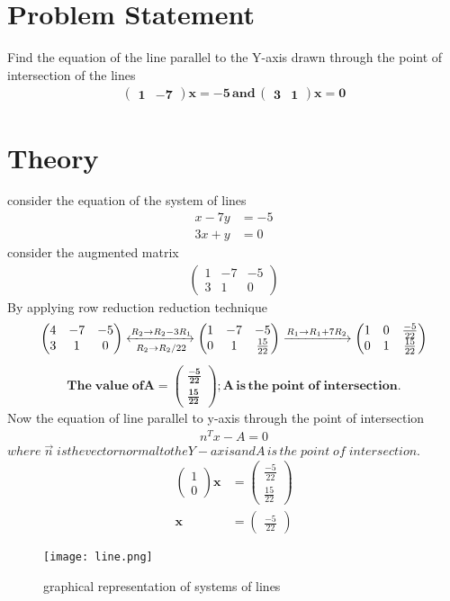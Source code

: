 \documentclass{article}
\newcommand{\myvec}[1]{\ensuremath{\begin{pmatrix}#1\end{pmatrix}}}
\begin{document}
\section{Problem Statement}
Find the equation of the line parallel to the Y-axis drawn through the point of intersection of the lines
\begin{align}
\mathbf{\myvec{1 & -7}x  =-5 \, and \, \myvec{3 & 1}x  = 0}
\end{align}
\section{Theory}
consider the equation of the system of lines
\begin{align}
x - 7y & = -5 \\
3x + y & = 0
\end{align}
 consider the augmented matrix
 \begin{align}
 \myvec{1 & -7 & -5 \\ 3 & 1 & 0}
 \end{align}
 By applying row reduction reduction technique \\
 \begin{align}
\myvec{4 & -7 & -5\\ 3 & 1 & 0}
	\xleftrightarrow[R_2 \rightarrow R_2/22]{R_2 \rightarrow R_2-3R_1}
	\myvec{1 & -7 & -5 \\ 0 & 1 & \frac{15}{22}}
	\xrightarrow[]{R_1 \rightarrow R_1+7R_2}
	 \myvec{1 & 0 & \frac{-5}{22} \\ 0 & 1 & \frac{15}{22}}
 \end{align}
\begin{align}
\mathbf{The\; value\; of{A} = \myvec{\frac{-5}{22} \\ \frac{15}{22}} ;
{A} \,is\, the\; point\; of \;intersection.}
\end{align}
 Now the equation of line parallel to y-axis through the point of intersection\\
\begin{align}
 {n}^T{x}-{A} = 0
\end{align}
$where \;\vec{n} \; is the vector normal to the Y - axis and{A}\, is\, the\; point\; of\; intersection.$
\begin{align}
\myvec{1 \\ 0}\bm{{x}} & = \myvec{ \frac{-5}{22}\\ \frac{15}{22}}
 \\
\bm{{x}} & = \myvec{\frac{-5}{22}} 
 \end{align}
 \begin{figure}
 \centering
 \texttt{[image: line.png]}
 \caption{graphical representation of systems of lines}
 \end{figure}
\end{document}
